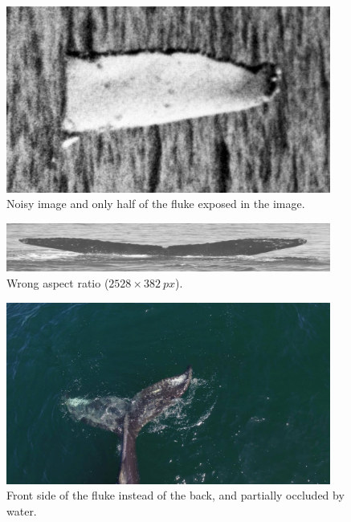 \documentclass[12pt,
    brazil,			%
	english,        %
	]{article}
\begin{document}
\begin{figure}
    \centering
    \includegraphics[width=0.95\textwidth]{images/whales/0d25e3354.jpg}
    \caption{Noisy image and only half of the fluke exposed in the image.}
    \label{fig:whale:0d25e3354}
\end{figure}

\begin{figure}
    \centering
    \includegraphics[width=0.95\textwidth]{images/whales/0d605d56a.jpg}
    \caption{Wrong aspect ratio ($2528 \times 382\: px$).}
    \label{fig:whale:0d605d56a}
\end{figure}

\begin{figure}
    \centering
    \includegraphics[width=0.95\textwidth]{images/whales/0d37648f9.jpg}
    \caption{Front side of the fluke instead of the back, and partially occluded by water.}
    \label{fig:whale:0d37648f9}
\end{figure}
\end{document}
